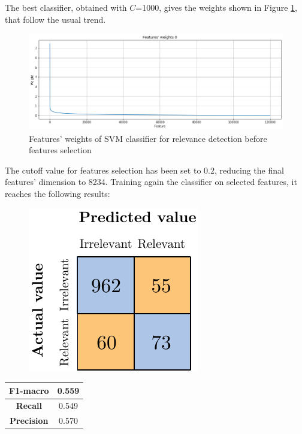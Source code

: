 The best classifier, obtained with $C$=1000, gives the weights shown in Figure \ref{fig:ita_rel_svm_fs}, that follow the usual trend.

\begin{figure}[H]
	\centering
	\includegraphics[width=\textwidth]{figures/conf_matrices/ita_rel_svm/ita_rel_svm_fs.png}
	\caption{Features' weights of SVM classifier for relevance detection before features selection}
	\label{fig:ita_rel_svm_fs}
\end{figure}

The cutoff value for features selection has been set to 0.2, reducing the final features' dimension to 8234. Training again the classifier on selected features, it reaches the following results:


\begin{figure}[H]
	\centering
	\includegraphics[scale=1]{figures/conf_matrices/ita_rel_svm/ita_rel_svm_afs.pdf}
	\label{fig:ita_rel_svm_afs}
\end{figure}

\begin{center}
	\begin{tabular}{ | c | c | } 
		\hline
		\textbf{F1-macro} & 0.559 \\
		\hline
		\textbf{Recall} & 0.549 \\ 
		\hline
		\textbf{Precision} & 0.570 \\ 
		\hline
	\end{tabular}
\end{center}

